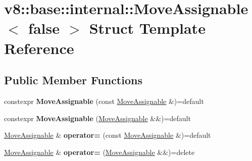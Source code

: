 \hypertarget{structv8_1_1base_1_1internal_1_1MoveAssignable_3_01false_01_4}{}\section{v8\+:\+:base\+:\+:internal\+:\+:Move\+Assignable$<$ false $>$ Struct Template Reference}
\label{structv8_1_1base_1_1internal_1_1MoveAssignable_3_01false_01_4}
\subsection*{Public Member Functions}
\begin{DoxyCompactItemize}
\item 
\mbox{\label{structv8_1_1base_1_1internal_1_1MoveAssignable_3_01false_01_4_a52ea6c7bf824ac2de4910ebd4ff9ca25}} 
constexpr {\bfseries Move\+Assignable} (const \mbox{\hyperlink{structv8_1_1base_1_1internal_1_1MoveAssignable}{Move\+Assignable}} \&)=default
\item 
\mbox{\label{structv8_1_1base_1_1internal_1_1MoveAssignable_3_01false_01_4_a791785adaa05e6cce697687ae5591a1d}} 
constexpr {\bfseries Move\+Assignable} (\mbox{\hyperlink{structv8_1_1base_1_1internal_1_1MoveAssignable}{Move\+Assignable}} \&\&)=default
\item 
\mbox{\label{structv8_1_1base_1_1internal_1_1MoveAssignable_3_01false_01_4_aedd31ee42752a0554bc11b5268ff3506}} 
\mbox{\hyperlink{structv8_1_1base_1_1internal_1_1MoveAssignable}{Move\+Assignable}} \& {\bfseries operator=} (const \mbox{\hyperlink{structv8_1_1base_1_1internal_1_1MoveAssignable}{Move\+Assignable}} \&)=default
\item 
\mbox{\label{structv8_1_1base_1_1internal_1_1MoveAssignable_3_01false_01_4_acbf8719d7c89fec9f261cfd71146d868}} 
\mbox{\hyperlink{structv8_1_1base_1_1internal_1_1MoveAssignable}{Move\+Assignable}} \& {\bfseries operator=} (\mbox{\hyperlink{structv8_1_1base_1_1internal_1_1MoveAssignable}{Move\+Assignable}} \&\&)=delete
\end{DoxyCompactItemize}


